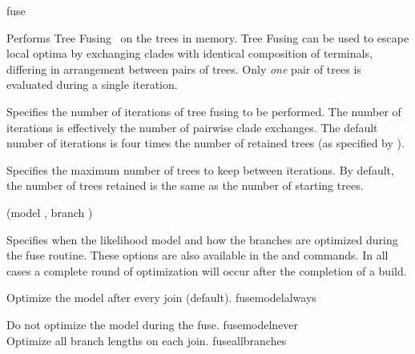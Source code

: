 \begin{command}{fuse}{}


    \begin{poydescription}
            Performs Tree Fusing~\cite{goloboff1999} on the trees in memory.  
            Tree Fusing  can be used to escape local optima
            by exchanging clades with identical composition of terminals, differing in arrangement
            between pairs of trees. Only \emph{one} pair of trees is evaluated during a single iteration.
    \end{poydescription}

    \begin{arguments}
            {Specifies the number of iterations of tree fusing to be performed. The
            number of iterations is effectively the number of pairwise clade exchanges. 
            The default number of iterations is four times the number of retained
            trees (as specified by ).}
            {}

            {Specifies the maximum number of trees to keep between iterations.
            By default, the number of trees retained is the same as the number
            of starting trees.}
            {}
                  
          {(model \optional {\poylident}, branch \optional {\poylident})}
            {Specifies when the likelihood model and how the branches are
            optimized during the fuse routine. These options are also available
            in the  and  commands. In all
            cases a complete round of optimization will occur after the
            completion of a build.

            \begin{description}

                    {Optimize the model after every join (default).}
                    {fusemodelalways}
                    
                    {Do not optimize the model during the fuse.}
                    {fusemodelnever}
\\
                    {Optimize all branch lengths on each join.}
                    {fuseallbranches}


\end{description}}
\end{arguments}
\end{command}
